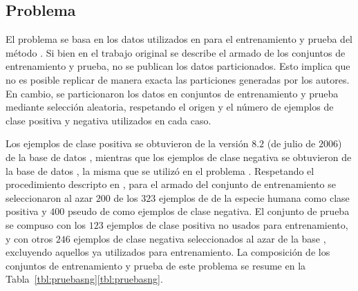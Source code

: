 %
%
\subsection{Problema \mipred{}}
%
El problema \prob\mipred{} se basa en los datos utilizados en
\cite{ng} para el entrenamiento y prueba del método \work\mipred{}.
Si bien en el trabajo original se describe el armado de los conjuntos
de entrenamiento y prueba, no se publican los datos particionados.
Esto implica que no es posible replicar de manera exacta las
particiones generadas por los autores.
En cambio, se particionaron los datos en conjuntos de entrenamiento y
prueba mediante selección aleatoria, respetando el origen y el número
de ejemplos de clase positiva y negativa utilizados en cada caso.

Los ejemplos de clase positiva se obtuvieron de la versión $8$.$2$ (de
julio de $2006$) de la base de datos \dset{\mirbase}, mientras que los
ejemplos de clase negativa se obtuvieron de la base de datos
, la misma que se utilizó en el problema
\prob\tripletsvm{}.
Respetando el procedimiento descripto en \cite{ng}, para el armado del
conjunto de entrenamiento  se seleccionaron al azar $200$
de los $323$ ejemplos de  de la especie humana como clase
positiva y $400$ pseudo  de  como ejemplos de
clase negativa.
El conjunto de prueba  se compuso con los $123$ ejemplos de
clase positiva no usados para entrenamiento, y con otros $246$
ejemplos de clase negativa seleccionados al azar de la base
, excluyendo aquellos ya utilizados para entrenamiento.
La composición de los conjuntos de entrenamiento y prueba de este
problema se resume en la
\iflatexml{}Tabla~\ref{tbl:pruebasng}\else\autoref{tbl:pruebasng}\fi.
